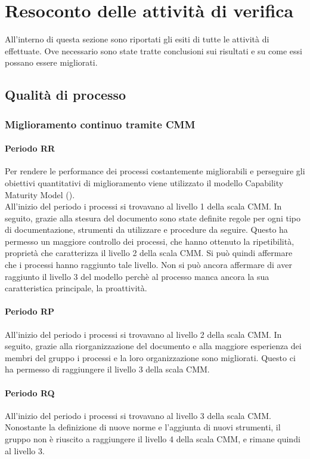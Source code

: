 \documentclass[PdQ.tex]{subfiles}
\begin{document}
\section{Resoconto delle attività di verifica}
All'interno di questa sezione sono riportati gli esiti di tutte le attività di  effettuate. Ove necessario sono state tratte conclusioni sui risultati e su come essi possano essere migliorati.

\subsection{Qualità di processo}
	\subsubsection{Miglioramento continuo tramite CMM}
		\paragraph{Periodo RR}
		Per rendere le performance dei processi costantemente migliorabili e perseguire gli obiettivi quantitativi di miglioramento viene utilizzato il modello Capability Maturity Model ().\\
		All'inizio del periodo i processi si trovavano al livello 1 della scala CMM. In seguito, grazie alla stesura del documento \NPdocRR{} sono state definite regole per ogni tipo di documentazione, strumenti da utilizzare e procedure da seguire. Questo ha permesso un maggiore controllo dei processi, che hanno ottenuto la ripetibilità, proprietà che caratterizza il livello 2 della scala CMM. Si può quindi affermare che i processi hanno raggiunto tale livello. Non si può ancora affermare di aver raggiunto il livello 3 del modello perchè al processo manca ancora la sua caratteristica principale, la proattività.\\

\paragraph{Periodo RP}

		All'inizio del periodo i processi si trovavano al livello 2 della scala CMM. In seguito, grazie alla riorganizzazione del documento \NPdocRP{} e alla maggiore esperienza dei membri del gruppo i processi e la loro organizzazione sono migliorati. Questo ci ha permesso di raggiungere il livello 3 della scala CMM.

\paragraph{Periodo RQ}
	All'inizio del periodo i processi si trovavano al livello 3 della scala CMM. Nonostante la definizione di nuove norme e l'aggiunta di nuovi strumenti, il gruppo non è riuscito a raggiungere il livello 4 della scala CMM, e rimane quindi al livello 3.
\end{document}
